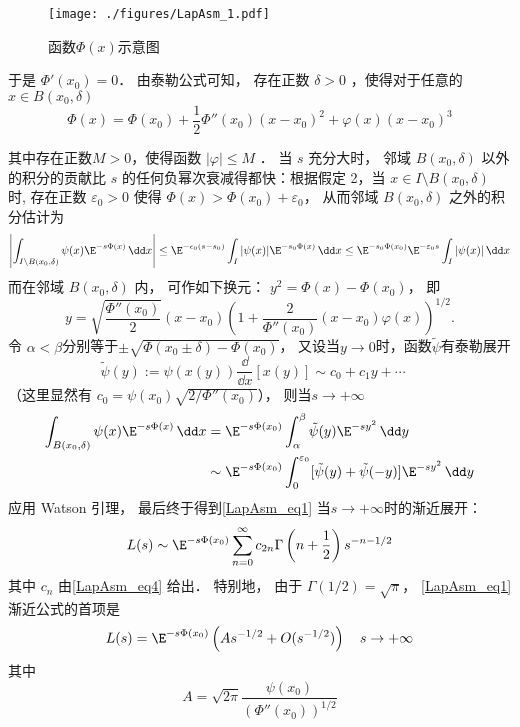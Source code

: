 \begin{figure}[ht]
\centering
\texttt{[image: ./figures/LapAsm\_1.pdf]}
\caption{函数$\Phi(x)$示意图} \label{LapAsm_fig1}
\end{figure}

于是 $\Phi'(x_0)=0$． 由泰勒公式可知， 存在正数 $\delta>0$ ，使得对于任意的 $x\in B(x_0,\delta)$  
\[
  \Phi(x)=\Phi(x_0)+\frac{1}{2}\Phi''(x_0)(x-x_0)^2+\varphi(x)(x-x_0)^3
\]

其中存在正数$M>0$，使得函数 $|\varphi|\leq M$ ． 当 $s$ 充分大时， 邻域 $B(x_0,\delta)$ 以外的积分的贡献比 $s$ 的任何负幂次衰减得都快：根据假定 2，当 $x\in I\setminus B(x_0,\delta)$ 时, 存在正数 $\varepsilon_0>0$ 使得 $\Phi(x)>\Phi(x_0)+\varepsilon_0$， 从而邻域 $B(x_0,\delta)$ 之外的积分估计为
\[
  \left|\int_{I\setminus B(x_0,\delta)}\psi(x)\E^{-s\Phi(x)}\,\dd x\right|
  \leq \E^{-\epsilon_0(s-s_0)}\int_I|\psi(x)|\E^{-s_0\Phi(x)}\,\dd x
  \leq \E^{-s_0\Phi(x_0)}\E^{-\varepsilon_0s}\int_{I}|\psi(x)|\,\dd x
\]
而在邻域 $B(x_0,\delta)$ 内， 可作如下换元： $y^2=\Phi(x)-\Phi(x_0)$， 即
\[
  y=\sqrt{\frac{\Phi''(x_0)}{2}}(x-x_0)\left(1+\frac{2}{\Phi''(x_0)}(x-x_0)\varphi(x)\right)^{1/2}.
\]
令 $\alpha<\beta$分别等于$\pm\sqrt{\Phi(x_0\pm\delta)-\Phi(x_0)}$， 又设当$y\to0$时，函数$\tilde{\psi}$有泰勒展开
\begin{equation}\label{LapAsm_eq4}
\tilde{\psi}(y):=\psi(x(y))\frac{\dd}{\dd x}[x(y)]\sim c_0+c_1y+\cdots \quad 
\end{equation}
（这里显然有 $c_0=\psi(x_0)\sqrt{2/\Phi''(x_0)}$）， 则当$s\to+\infty$
$$
\begin{aligned}
\int_{B(x_0,\delta)}\psi(x)\E^{-s\Phi(x)}\,\dd x
&=\E^{-s\Phi(x_0)}\int_{\alpha}^{\beta}\tilde \psi(y)\E^{-sy^2}\,\dd y\\
&\sim\E^{-s\Phi(x_0)}\int_{0}^{\varepsilon_0}[\tilde \psi(y)+\tilde \psi(-y)]\E^{-sy^2}\,\dd y
\end{aligned}
$$
应用 Watson 引理， 最后终于得到\autoref{LapAsm_eq1} 当$s\to+\infty$时的渐近展开：
\begin{equation}\label{LapAsm_eq5}
  L(s)\sim \E^{-s\Phi(x_0)}\sum_{n=0}^\infty c_{2n}\Gamma\left(n+\frac{1}{2}\right)s^{-n-1/2}
\end{equation}
其中 $c_n$ 由\autoref{LapAsm_eq4} 给出． 特别地， 由于 $\Gamma(1/2)=\sqrt{\pi}$， \autoref{LapAsm_eq1} 渐近公式的首项是
\[
L(s)=\E^{-s\Phi(x_0)}\left(As^{-1/2}+O(s^{-1/2})\right)\quad s\to+\infty
\]
其中
\[
  A=\sqrt{2\pi}\frac{\psi(x_0)}{(\Phi''(x_0))^{1/2}}
\]

